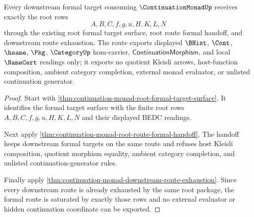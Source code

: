 \begin{theorem}
\label{thm:continuation-monad-root-formal-route-saturation}
Every downstream formal target consuming $\ContinuationMonadUp$ receives exactly the root rows
$$
A,B,C,f,g,u,H,K,L,N
$$
through the existing root formal target surface, root route formal handoff, and downstream route exhaustion. The route exports displayed $\BHist$, $\Cont$, $\hsame$, $\Pkg$, $\CategoryUp$ hom-carrier, $\mathsf{ContinuationMorphism}$, and local $\NameCert$ readings only; it exports no quotient Kleisli arrows, host-function composition, ambient category completion, external monad evaluator, or unlisted continuation generator.
\end{theorem}
\begin{proof}
Start with \autoref{thm:continuation-monad-root-formal-target-surface}. It identifies the formal target surface with the finite root rows $A,B,C,f,g,u,H,K,L,N$ and their displayed BEDC readings.

Next apply \autoref{thm:continuation-monad-root-route-formal-handoff}. The handoff keeps downstream formal targets on the same route and refuses host Kleisli composition, quotient morphism equality, ambient category completion, and unlisted continuation-generator rules.

Finally apply \autoref{thm:continuation-monad-downstream-route-exhaustion}. Since every downstream route is already exhausted by the same root package, the formal route is saturated by exactly those rows and no external evaluator or hidden continuation coordinate can be exported.
\end{proof}

